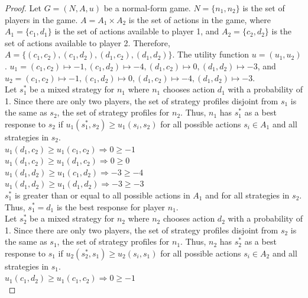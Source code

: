 \begin{proof}
  Let $G=(N, A, u)$ be a normal-form game. $N = \{n_1, n_2\}$ is the set of players in the game. $A=A_1\times A_2$ is the set of actions in the game, where $A_1=\{c_1, d_1\}$ is the set of actions available to player 1, and $A_2=\{c_2, d_2\}$ is the set of actions available to player 2. Therefore, $A=\{(c_1, c_2), (c_1, d_2), (d_1, c_2), (d_1, d_2)\}$. The utility function $u=(u_1, u_2)$. $u_1=(c_1, c_2)\mapsto -1, (c_1, d_2)\mapsto -4, (d_1, c_2)\mapsto 0, (d_1, d_2)\mapsto -3$, and $u_2=(c_1, c_2)\mapsto -1, (c_1, d_2)\mapsto 0, (d_1, c_2)\mapsto -4, (d_1, d_2)\mapsto -3$.\\

  Let $s^*_1$ be a mixed strategy for $n_1$ where $n_1$ chooses action $d_1$ with a probability of 1. Since there are only two players, the set of strategy profiles disjoint from $s_1$ is the same as $s_2$, the set of strategy profiles for $n_2$. Thus, $n_1$ has $s^*_1$ as a best response to $s_2$ if $u_1(s^*_1, s_2)\ge u_1(s_i, s_2)$ for all possible actions $s_i\in A_1$ and all strategies in $s_2$.\\
  
  $u_1(d_1, c_2)\ge u_1(c_1, c_2) \Rightarrow 0\ge -1$\\
  
  $u_1(d_1, c_2)\ge u_1(d_1, c_2) \Rightarrow 0\ge 0$\\

  $u_1(d_1, d_2)\ge u_1(c_1, d_2) \Rightarrow -3\ge -4$\\

  $u_1(d_1, d_2)\ge u_1(d_1, d_2) \Rightarrow -3\ge -3$\\

  $s^*_1$ is greater than or equal to all possible actions in $A_1$ and for all strategies in $s_2$. Thus, $s^*_1=d_1$ is the best response for player $n_1$.\\

  Let $s^*_2$ be a mixed strategy for $n_2$ where $n_2$ chooses action $d_2$ with a probability of 1. Since there are only two players, the set of strategy profiles disjoint from $s_2$ is the same as $s_1$, the set of strategy profiles for $n_1$. Thus, $n_2$ has $s^*_2$ as a best response to $s_1$ if $u_2(s^*_2, s_1)\ge u_2(s_i, s_1)$ for all possible actions $s_i\in A_2$ and all strategies in $s_1$.\\
  
  $u_1(c_1, d_2)\ge u_1(c_1, c_2) \Rightarrow 0\ge -1$\\


\end{proof}
